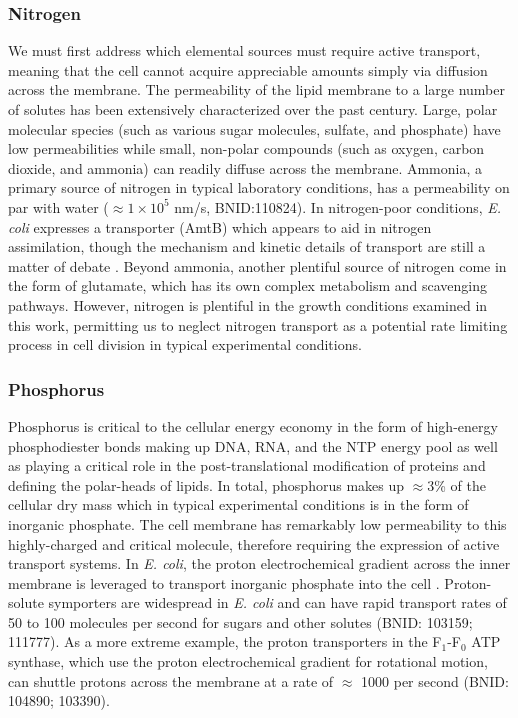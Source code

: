 \subsubsection{Nitrogen}
We must first address which elemental sources must require active transport,
meaning that the cell cannot acquire appreciable amounts simply via diffusion
across the membrane. The permeability of the lipid membrane to a large number
of solutes has been extensively characterized over the past century. Large,
polar molecular species (such as various sugar molecules, sulfate, and
phosphate) have low permeabilities while small, non-polar compounds (such as
oxygen, carbon dioxide, and ammonia) can readily diffuse across the membrane.
Ammonia, a primary source of nitrogen in typical laboratory conditions, has a
permeability on par with water ($\approx 1\times 10^{5}$ nm/s, BNID:110824). In
nitrogen-poor conditions, \textit{E. coli} expresses a transporter (AmtB)
which appears to aid in nitrogen assimilation, though the mechanism and
kinetic details of transport are still a matter of debate
\citep{heeswijk2013a, khademi2004}. Beyond ammonia, another plentiful source
of nitrogen come in the form of glutamate, which has its own complex
metabolism and scavenging pathways. However, nitrogen is plentiful in the
growth conditions examined in this work, permitting us to neglect nitrogen
transport as a potential rate limiting process in cell division in typical
experimental conditions.

\subsubsection{Phosphorus}
Phosphorus is critical to the cellular energy economy in the form of high-energy
phosphodiester bonds making up DNA, RNA, and the NTP energy pool as well as
playing a critical role in the post-translational modification of proteins and
defining the polar-heads of lipids. In total, phosphorus makes up $\approx$3\%
of the cellular dry mass which in typical experimental conditions is in the form
of inorganic phosphate. The cell membrane has remarkably low permeability to
this highly-charged and critical molecule, therefore requiring the expression of
active transport systems. In \textit{E. coli}, the proton electrochemical
gradient across the inner membrane is leveraged to transport inorganic phosphate
into the cell \citep{rosenberg1977}. Proton-solute symporters are widespread in
\textit{E. coli} \citep{ramos1977, booth1979} and can have rapid transport rates
of 50 to 100 molecules per second for sugars and other solutes (BNID: 103159;
111777). As a more extreme example, the proton transporters in the F$_1$-F$_0$
ATP synthase, which use the proton electrochemical gradient for rotational
motion, can shuttle protons across the membrane at a rate of $\approx$ 1000 per
second (BNID: 104890; 103390).

